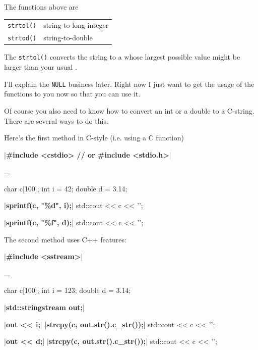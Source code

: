 The functions above are

\begin{tabular}{ll}
\texttt{strtol()} & string-to-long-integer \\
\texttt{strtod()} & string-to-double \\
\end{tabular}

The \texttt{strtol()} converts the string to a  whose largest possible value might be larger than your usual .

I'll explain the \texttt{NULL} business later. Right now I just want to get the usage of the functions to you now so that you can use it.


\newpage{}

Of course you also need to know how to convert an int or a double to a C-string. There are several ways to do this.

Here's the first method in C-style (i.e. using a C function)

\begin{consolethree}[escapeinside=||]
|\textbf{\#include <cstdio> // or \#include <stdio.h>}|

...

char c[100];
int i = 42;
double d = 3.14;

|\textbf{sprintf(c, "\%d", i);}|
std::cout << c << '\n';

|\textbf{sprintf(c, "\%f", d);}|
std::cout << c << '\n';
\end{consolethree}

The second method uses C++ features:

\begin{consolethree}[escapeinside=||]
|\textbf{\#include <sstream>}|

...

char c[100];
int i = 123;
double d = 3.14;

|\textbf{std::stringstream out;}|

|\textbf{out << i;}|
|\textbf{strcpy(c, out.str().c\_str());}|
std::cout << c << '\n';

|\textbf{out << d;}|
|\textbf{strcpy(c, out.str().c\_str());}|
std::cout << c << '\n';
\end{consolethree}

\newpage{}






